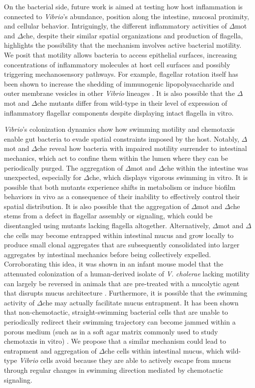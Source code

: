 {{{{{{{On the bacterial side, future work is aimed at testing how host inflammation is connected to \textit{Vibrio}'s abundance, position along the intestine, mucosal proximity, and cellular behavior. Intriguingly, the different inflammatory activities of $\Delta$mot and $\Delta$che, despite their similar spatial organizations and production of flagella, highlights the possibility that the mechanism involves active bacterial motility. We posit that motility allows bacteria to access epithelial surfaces, increasing concentrations of inflammatory molecules at host cell surfaces and possibly triggering mechanosensory pathways. For example, flagellar rotation itself has been shown to increase the shedding of immunogenic lipopolysaccharide and outer membrane vesicles in other \textit{Vibrio} lineages \cite{brennan_model_2014,aschtgen_rotation_2016}. It is also possible that the $\Delta$mot and $\Delta$che mutants differ from wild-type in their level of expression of inflammatory flagellar components despite displaying intact flagella in vitro. 

\textit{Vibrio}'s colonization dynamics show how swimming motility and chemotaxis enable gut bacteria to evade spatial constraints imposed by the host. Notably, $\Delta$mot and $\Delta$che reveal how bacteria with impaired motility surrender to intestinal mechanics, which act to confine them within the lumen where they can be periodically purged. The aggregation of $\Delta$mot and $\Delta$che within the intestine was unexpected, especially for $\Delta$che, which displays vigorous swimming in vitro. It is possible that both mutants experience shifts in metabolism or induce biofilm behaviors in vivo as a consequence of their inability to effectively control their spatial distribution. It is also possible that the aggregation of $\Delta$mot and $\Delta$che stems from a defect in flagellar assembly or signaling, which could be disentangled using mutants lacking flagella altogether. Alternatively, $\Delta$mot and $\Delta$che cells may become entrapped within intestinal mucus and grow locally to produce small clonal aggregates that are subsequently consolidated into larger aggregates by intestinal mechanics before being collectively expelled. Corroborating this idea, it was shown in an infant mouse model that the attenuated colonization of a human-derived isolate of \textit{V. }\textit{cholerae} lacking motility can largely be reversed in animals that are pre-treated with a mucolytic agent that disrupts mucus architecture \cite{millet_insights_2014}. Furthermore, it is possible that the swimming activity of $\Delta$che may actually facilitate mucus entrapment. It has been shown that non-chemotactic, straight-swimming bacterial cells that are unable to periodically redirect their swimming trajectory can become jammed within a porous medium (such as in a soft agar matrix commonly used to study chemotaxis in vitro) \cite{licata_diffusion_2016}. We propose that a similar mechanism could lead to entrapment and aggregation of $\Delta$che cells within intestinal mucus, which wild-type \textit{Vibrio} cells avoid because they are able to actively escape from mucus through regular changes in swimming direction mediated by chemotactic signaling.

}}}}}}}
